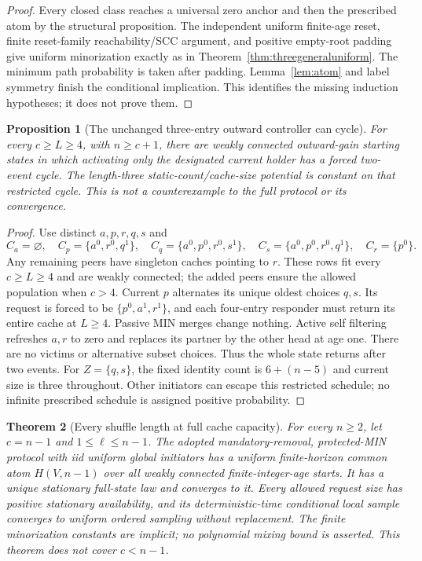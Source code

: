 \documentclass[11pt]{article}
\newtheorem{theorem}{Theorem}
\newtheorem{proposition}[theorem]{Proposition}
\begin{document}
\begin{proof}
Every closed class reaches a universal zero anchor and then
the prescribed atom by the structural proposition. The independent
uniform finite-age reset, finite reset-family reachability/SCC
argument, and positive empty-root padding give uniform minorization
exactly as in Theorem~\ref{thm:threegeneraluniform}. The minimum
path probability is taken after padding. Lemma~\ref{lem:atom}
and label symmetry finish the conditional implication. This
identifies the missing induction hypotheses; it does not prove them.
\end{proof}

\begin{proposition}[The unchanged three-entry outward controller can cycle]
\label{prop:longeroutwardcontrollercycle}
For every $c\ge L\ge4$, with $n\ge c+1$, there are weakly
connected outward-gain starting states in which activating only
the designated current holder has a forced two-event cycle.
The length-three static-count/cache-size potential is constant
on that restricted cycle. This is not a counterexample to the
full protocol or its convergence.
\end{proposition}
\begin{proof}
Use distinct $a,p,r,q,s$ and
\[
 C_a=\varnothing,\quad C_p=\{a^0,r^0,q^1\},\quad
 C_q=\{a^0,p^0,r^0,s^1\},\quad
 C_s=\{a^0,p^0,r^0,q^1\},\quad C_r=\{p^0\}.
\]
Any remaining peers have singleton caches pointing to $r$.
These rows fit every $c\ge L\ge4$ and are weakly connected;
the added peers ensure the allowed population when $c>4$.
Current $p$ alternates its unique oldest choices $q,s$.
Its request is forced to be $\{p^0,a^1,r^1\}$, and each
four-entry responder must return its entire cache at $L\ge4$.
Passive MIN merges change nothing. Active self filtering
refreshes $a,r$ to zero and replaces its partner by the other
head at age one. There are no victims or alternative subset
choices. Thus the whole state returns after two events.
For $Z=\{q,s\}$, the fixed identity count is $6+(n-5)$ and
current size is three throughout. Other initiators can escape
this restricted schedule; no infinite prescribed schedule is
assigned positive probability.
\end{proof}

\begin{theorem}[Every shuffle length at full cache capacity]
\label{thm:fullcapacityalllengths}
For every $n\ge2$, let $c=n-1$ and $1\le\ell\le n-1$.
The adopted mandatory-removal, protected-MIN protocol with iid
uniform global initiators has a uniform finite-horizon common atom
$H(V,n-1)$ over all weakly connected finite-integer-age starts.
It has a unique stationary full-state law and converges to it.
Every allowed request size has positive stationary availability,
and its deterministic-time conditional local sample converges to
uniform ordered sampling without replacement.
The finite minorization constants are implicit; no polynomial
mixing bound is asserted. This theorem does not cover $c<n-1$.
\end{theorem}
\end{document}
